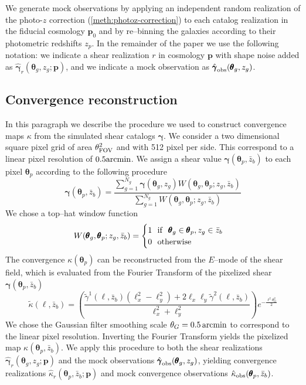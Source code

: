 \documentclass[reprint,aps,prd,superscriptaddress,showkeys,showpacs]{revtex4-1}
\newcommand{\bb}[1]{\mathbf{#1}}
\newcommand{\h}[1]{\hat{#1}}
\begin{document}
We generate mock observations by applying an independent random realization of the photo-$z$ correction (\ref{meth:photoz-correction}) to each catalog realization in the fiducial cosmology $\bb{p}_0$ and by re--binning the galaxies according to their photometric redshifts $z_p$. In the remainder of the paper we use the following notation: we indicate a shear realization $r$ in cosmology $\bb{p}$ with shape noise added as $\h{\pmb{\gamma}}_r(\pmb{\theta}_g,z_g;\bb{p})$, and we indicate a mock observation as $\h{\pmb{\gamma}}_{\rm obs}(\pmb{\theta}_g,z_g)$.           


\subsection{Convergence reconstruction}
In this paragraph we describe the procedure we used to construct convergence maps $\kappa$ from the simulated shear catalogs $\pmb{\gamma}$. We consider a two dimensional square pixel grid of area $\theta_{\rm FOV}^2$ and with 512 pixel per side. This correspond to a linear pixel resolution of $0.5 \rm{arcmin}$. We assign a shear value $\pmb{\gamma}(\pmb{\theta}_p,\bar{z}_b)$ to each pixel $\pmb{\theta}_p$ according to the following procedure
\begin{equation}
\pmb{\gamma}(\pmb{\theta}_p,\bar{z}_b) = \frac{\sum_{g=1}^{N_g}\pmb{\gamma}(\pmb{\theta}_g,z_g)W(\pmb{\theta}_g,\pmb{\theta}_p;z_g,\bar{z}_b)}{\sum_{g=1}^{N_g}W(\pmb{\theta}_g,\pmb{\theta}_p;z_g,\bar{z}_b)}
\end{equation}   
%
We chose a top--hat window function
\begin{equation}
W(\pmb{\theta}_g,\pmb{\theta}_p;z_g,\bar{z}_b) = 
\begin{cases}
1 \,\,\,\,{\rm if}\,\,\,\, \pmb{\theta}_g\in\pmb{\theta}_p,z_g\in\bar{z}_b \\
0 \,\,\,\,{\rm otherwise}
\end{cases}
\end{equation} 
%
The convergence $\kappa(\pmb{\theta}_p)$ can be reconstructed from the $E$--mode of the shear field, which is evaluated from the Fourier Transform of the pixelized shear $\pmb{\gamma}(\pmb{\theta}_p,\bar{z}_b)$
\begin{equation}
\label{meth:psdefinition}
\tilde\kappa(\pmb{\ell},\bar{z}_b) = \left(\frac{\tilde{\gamma}^1(\pmb{\ell},\bar{z}_b)(\ell_x^2-\ell_y^2)+2\ell_x\ell_y\tilde{\gamma}^2(\pmb{\ell},\bar{z}_b)}{\ell_x^2+\ell_y^2}\right) e^{-\frac{\ell^2\theta_G^2}{2}}
\end{equation}
%
We chose the Gaussian filter smoothing scale $\theta_G=0.5\,{\rm arcmin}$ to correspond to the linear pixel resolution. Inverting the Fourier Transform yields the pixelized map $\kappa(\pmb{\theta}_p,\bar{z}_b)$. We apply this procedure to both the shear realizations $\h{\pmb{\gamma}}_r(\pmb{\theta}_g,z_g;\bb{p})$ and the mock observations $\h{\pmb{\gamma}}_{\rm obs}(\pmb{\theta}_g,z_g)$, yielding convergence realizations $\h{\kappa}_r(\pmb{\theta}_p,\bar{z}_b;\bb{p})$ and mock convergence observations $\h{\kappa}_{\rm obs}(\pmb{\theta}_p,\bar{z}_b)$. 
\end{document}
